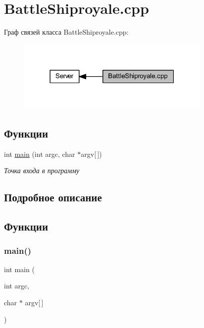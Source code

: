 \hypertarget{group__battleshiproyalecpp}{}\section{Battle\+Shiproyale.\+cpp}
\label{group__battleshiproyalecpp}
Граф связей класса Battle\+Shiproyale.\+cpp\+:\nopagebreak
\begin{figure}[H]
\begin{center}
\leavevmode
\includegraphics[width=267pt]{group__battleshiproyalecpp}
\end{center}
\end{figure}
\subsection*{Функции}
\begin{DoxyCompactItemize}
\item 
int \mbox{\hyperlink{group__battleshiproyalecpp_ga0ddf1224851353fc92bfbff6f499fa97}{main}} (int argc, char $\ast$argv\mbox{[}$\,$\mbox{]})
\begin{DoxyCompactList}\small\item\em Точка входа в программу \end{DoxyCompactList}\end{DoxyCompactItemize}


\subsection{Подробное описание}


\subsection{Функции}
\mbox{\label{group__battleshiproyalecpp_ga0ddf1224851353fc92bfbff6f499fa97}} 
\subsubsection{\texorpdfstring{main()}{main()}}
{\footnotesize\ttfamily int main (\begin{DoxyParamCaption}\item[{int}]{argc,  }\item[{char $\ast$}]{argv\mbox{[}$\,$\mbox{]} }\end{DoxyParamCaption})}



